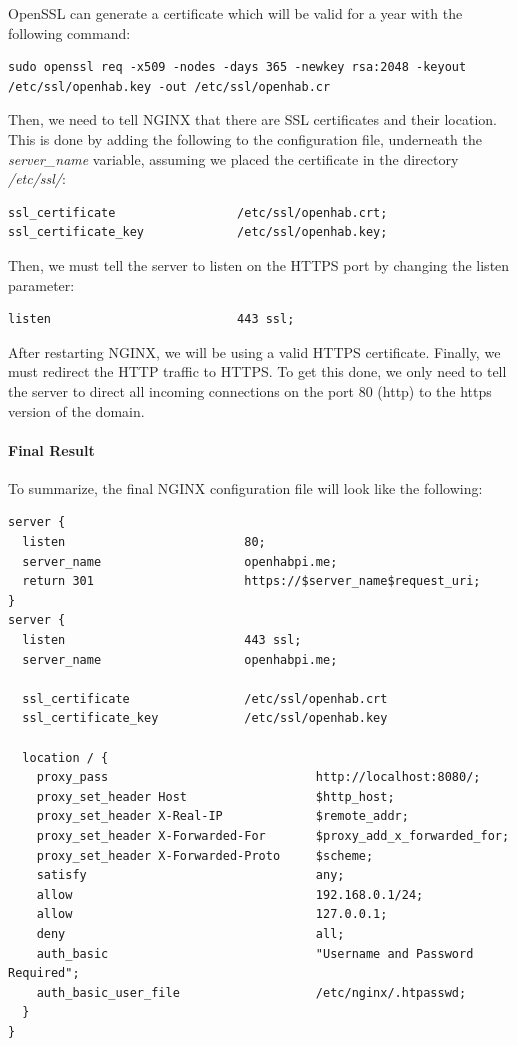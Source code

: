 OpenSSL can generate a certificate which will be valid for a year with the following command:

\begin{lstlisting}[style=Consola]
sudo openssl req -x509 -nodes -days 365 -newkey rsa:2048 -keyout /etc/ssl/openhab.key -out /etc/ssl/openhab.cr
\end{lstlisting}

Then, we need to tell NGINX that there are SSL certificates and their location. This is done by adding the following to the
configuration file, underneath the \textit{server\_name} variable, assuming we placed the certificate in the directory \textit{/etc/ssl/}:

\begin{lstlisting}[style=Consola]
ssl_certificate                 /etc/ssl/openhab.crt;
ssl_certificate_key             /etc/ssl/openhab.key;
\end{lstlisting}

Then, we must tell the server to listen on the HTTPS port by changing the listen parameter:

\begin{lstlisting}[style=Consola]
listen                          443 ssl;
\end{lstlisting}

After restarting NGINX, we will be using a valid HTTPS certificate. Finally, we must redirect the HTTP traffic to HTTPS. To get this
done, we only need to tell the server to direct all incoming connections on the port 80 (http) to the https version of the domain.

\paragraph{Final Result}
To summarize, the final NGINX configuration file will look like the following:

\begin{lstlisting}[style=Consola]
server {
  listen                         80;
  server_name                    openhabpi.me;
  return 301                     https://$server_name$request_uri;
}
server {
  listen                         443 ssl;
  server_name                    openhabpi.me;

  ssl_certificate                /etc/ssl/openhab.crt
  ssl_certificate_key            /etc/ssl/openhab.key

  location / {
    proxy_pass                             http://localhost:8080/;
    proxy_set_header Host                  $http_host;
    proxy_set_header X-Real-IP             $remote_addr;
    proxy_set_header X-Forwarded-For       $proxy_add_x_forwarded_for;
    proxy_set_header X-Forwarded-Proto     $scheme;
    satisfy                                any;
    allow                                  192.168.0.1/24;
    allow                                  127.0.0.1;
    deny                                   all;
    auth_basic                             "Username and Password Required";
    auth_basic_user_file                   /etc/nginx/.htpasswd;
  }
}
\end{lstlisting}

